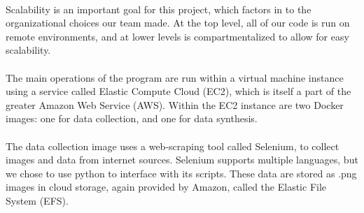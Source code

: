 \documentclass{article}
\begin{document}
  \paragraph{}
  Scalability is an important goal for this project, which factors in to the organizational choices our team made. At the top level, all of our code is run on remote environments, and at lower levels is compartmentalized to allow for easy scalability.
  \paragraph{}
  The main operations of the program are run within a virtual machine instance using a service called Elastic Compute Cloud (EC2), which is itself a part of the greater Amazon Web Service (AWS). Within the EC2 instance are two Docker images: one for data collection, and one for data synthesis.
  \paragraph{}
  The data collection image uses a web-scraping tool called Selenium, to collect images and data from internet sources. Selenium supports multiple languages, but we chose to use python to interface with its scripts. These data are stored as .png images in cloud storage, again provided by Amazon, called the Elastic File System (EFS).
\end{document}
